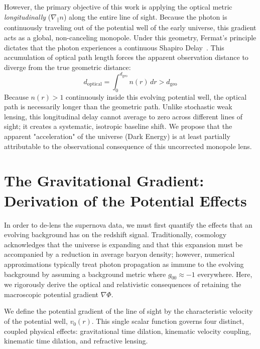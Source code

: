 \documentclass[11pt]{article}
\begin{document}
However, the primary objective of this work is applying the optical metric \textit{longitudinally} ($\nabla_{\parallel} n$) along the entire line of sight. Because the photon is continuously traveling out of the potential well of the early universe, this gradient acts as a global, non-canceling monopole. Under this geometry, Fermat's principle dictates that the photon experiences a continuous Shapiro Delay~\cite{Shapiro1964}. This accumulation of optical path length forces the apparent observation distance to diverge from the true geometric distance:
\begin{equation}\label{eq:longitudinal_delay}
d_{\mathrm{optical}} = \int_{0}^{d_{\mathrm{geo}}} n(r) \, dr > d_{\mathrm{geo}}
\end{equation}
Because $n(r) > 1$ continuously inside this evolving potential well, the optical path is necessarily longer than the geometric path. Unlike stochastic weak lensing, this longitudinal delay cannot average to zero across different lines of sight; it creates a systematic, isotropic baseline shift. We propose that the apparent "acceleration" of the universe (Dark Energy) is at least partially attributable to the observational consequence of this uncorrected monopole lens.

\section{The Gravitational Gradient: Derivation of the Potential Effects}
\label{sec:gravitational_gradient}

In order to de-lens the supernova data, we must first quantify the effects that an evolving background has on the redshift signal. Traditionally, cosmology acknowledges that the universe is expanding and that this expansion must be accompanied by a reduction in average baryon density; however, numerical approximations typically treat photon propagation as immune to the evolving background by assuming a background metric where $g_{00} \approx -1$ everywhere. Here, we rigorously derive the optical and relativistic consequences of retaining the macroscopic potential gradient $\nabla \Phi$.

We define the potential gradient of the line of sight by the characteristic velocity of the potential well, $v_0(r)$. This single scalar function governs four distinct, coupled physical effects: gravitational time dilation, kinematic velocity coupling, kinematic time dilation, and refractive lensing.
\end{document}
